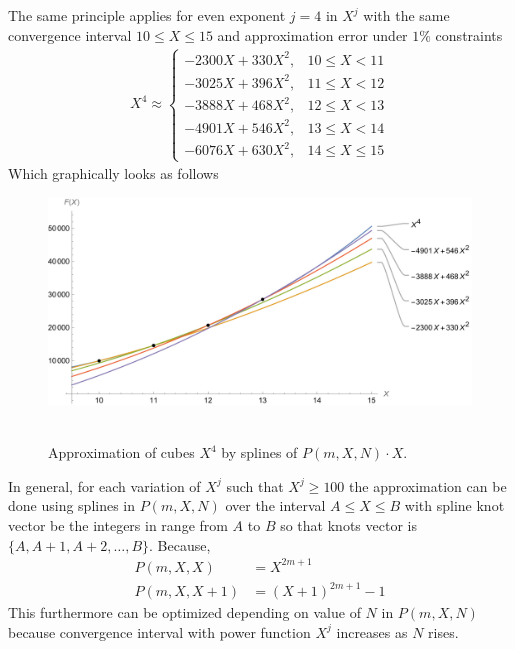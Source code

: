 The same principle applies for even exponent $j=4$ in $X^j$ with the same convergence interval $10 \leq X \leq 15$
and approximation error under $1\%$ constraints
\begin{align*}
    X^4 \approx
    \begin{cases}
        -2300X + 330X^2, & 10 \leq X < 11 \\
        -3025X + 396X^2, & 11 \leq X < 12 \\
        -3888X + 468X^2, & 12 \leq X < 13 \\
        -4901X + 546X^2, & 13 \leq X < 14 \\
        -6076X + 630X^2, & 14 \leq X \leq 15
    \end{cases}
\end{align*}
Which graphically looks as follows
\begin{figure}[H]
    \centering
    \includegraphics[width=1\textwidth]{sections/images/09_plots_of_fourth_power_with_p_2_10_15_times_x}
    ~\caption{Approximation of cubes $X^4$ by splines of $P(m,X,N) \cdot X$.
    }\label{fig:09_plots_of_fourth_power_with_p_2_10_15_times_x}
\end{figure}
In general, for each variation of $X^j$ such that $X^j \geq 100$ the approximation can be done using
splines in $P(m,X, N)$ over the interval $A \leq X \leq B$ with spline knot vector be the integers in
range from $A$ to $B$ so that knots vector is $\{A, A+1, A+2, \ldots, B \}$.
Because,
\begin{align*}
    P(m,X, X) &= X^{2m+1} \\
    P(m,X, X+1) &= (X+1)^{2m+1} - 1
\end{align*}
This furthermore can be optimized depending on value of $N$ in $P(m,X,N)$ because convergence interval
with power function $X^j$ increases as $N$ rises.
